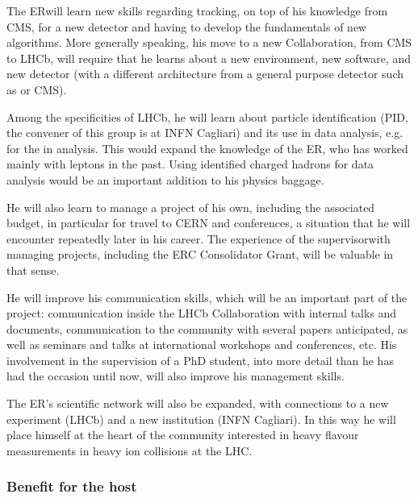\documentclass[a4paper,11pt]{article}
\newcommand{\ER}{ER}
\newcommand{\supervisor}{the supervisor}
\begin{document}
The \ER will learn new skills regarding tracking, on top of his knowledge from CMS, for a new detector and having to develop the fundamentals of new algorithms. More generally speaking, his move to a new Collaboration, from CMS to LHCb, will require that he learns about a new environment, new software, and new detector (with a different architecture from a general purpose detector such as \DO or CMS). 

Among the specificities of LHCb, he will learn about particle identification (PID, the convener of this group is at INFN Cagliari) and its use in data analysis, e.g. for the \Dz in \pbpb analysis. 
This would expand the knowledge of the \ER, who has worked mainly with leptons in the past. Using identified charged hadrons for data analysis would be an important addition to his physics baggage.

He will also learn to manage a project of his own, including the associated budget, in particular for travel to CERN and conferences, a situation that he will encounter repeatedly later in his career. The experience of \supervisor with managing projects, including the ERC Consolidator Grant, will be valuable in that sense.

He will improve his communication skills, which will be an important part of the project: communication inside the LHCb Collaboration with internal talks and documents, communication to the community with several papers anticipated, as well as seminars and talks at international workshops and conferences, etc. His involvement in the supervision of a PhD student, into more detail than he has had the occasion until now, will also improve his management skills.

The \ER's scientific network will also be expanded, with connections to a new experiment (LHCb) and a new institution (INFN Cagliari). In this way he will place himself at the heart of the community interested in heavy flavour measurements in heavy ion collisions at the LHC.



\subsubsection{Benefit for the host}
\end{document}
